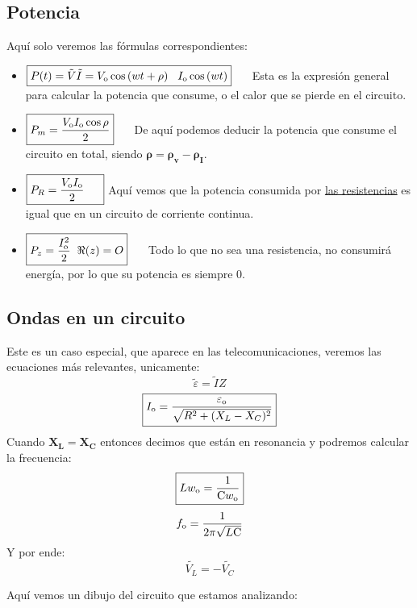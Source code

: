 \subsection{Potencia}
 Aquí solo veremos las fórmulas correspondientes:
\begin{itemize}
        \item \(
              \boxed{P(t) = \tilde{V}\tilde{I} = V_{\textnormal{o}}\cos{(wt + \rho)}\hspace{3mm}I_{\textnormal{o}}\cos{(wt)}} \hspace{5mm} \) Esta es la expresión general para calcular la potencia que consume, o el calor que se pierde en el circuito.
        \item \(
              \boxed{P_m = \frac{V_{\textnormal{o}}I_{\textnormal{o}}\cos{\rho}}{2}}\hspace{5mm}
              \) De aquí podemos deducir la potencia que consume el circuito en total, siendo \(\mathbf{\rho = \rho_v - \rho_I}\).
        \item \(
              \boxed{P_R= \frac{V_{\textnormal{o}}I_{\textnormal{o}}}{2}\hspace{5mm}}\) Aquí vemos que la potencia consumida por \underline{las resistencias} es igual que en un circuito de corriente continua.
              \item\(\boxed{P_z = \frac{I_{\textnormal{o}}^2}{2}\hspace{2mm} \Re(z) = O} \hspace{5mm}
              \) Todo lo que no sea una resistencia, no consumirá energía, por lo que su potencia es siempre 0.
\end{itemize}
\subsection{Ondas en un circuito}
 Este es un caso especial, que aparece en las telecomunicaciones, veremos las ecuaciones más relevantes, unicamente:
\[
        \tilde{\varepsilon} = \tilde{I}Z
\]
\[
        \boxed{I_{\textnormal{o}} = \frac{\varepsilon_{\textnormal{o}}}{\sqrt{R^2+(X_L - X_C)^2}}}
\]
 Cuando \(\mathbf{X_L = X_C}\) entonces decimos que están en resonancia y podremos calcular la frecuencia:
\[
        \boxed{Lw_{\textnormal{o}} = \frac{1}{\mathrm{C}w_{\textnormal{o}}}}
\]
\[
        f_{\textnormal{o}} = \frac{1}{2\pi\sqrt{L\mathrm{C}}}
\]
 Y por ende:
\[
        \boxed{\tilde{V_L} = -\tilde{V_C}}
\]
\begin{wrapfigure}{l}{2cm}
\end{wrapfigure}
 Aquí vemos un dibujo del circuito que estamos analizando: